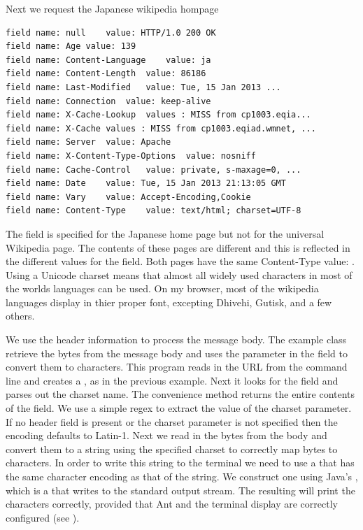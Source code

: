 Next we request the Japanese wikipedia hompage
%
\begin{verbatim}
field name: null	value: HTTP/1.0 200 OK 
field name: Age	value: 139
field name: Content-Language	value: ja
field name: Content-Length	value: 86186
field name: Last-Modified	value: Tue, 15 Jan 2013 ...
field name: Connection	value: keep-alive
field name: X-Cache-Lookup	values : MISS from cp1003.eqia...
field name: X-Cache	values : MISS from cp1003.eqiad.wmnet, ...
field name: Server	value: Apache
field name: X-Content-Type-Options	value: nosniff
field name: Cache-Control	value: private, s-maxage=0, ...
field name: Date	value: Tue, 15 Jan 2013 21:13:05 GMT
field name: Vary	value: Accept-Encoding,Cookie
field name: Content-Type	value: text/html; charset=UTF-8
\end{verbatim}
%
The field  is specified for the Japanese home page
but not for the universal Wikipedia page.  The contents of these pages are different
and this is reflected in the different values for the  field.
Both pages have the same Content-Type value: .
Using a Unicode charset means that almost all widely used characters in most of the
worlds languages can be used.
On my browser, most of the wikipedia languages display in thier proper font, excepting
Dhivehi, Gutisk, and a few others.

We use the header information to process the message body.
The example class  retrieve the bytes from the message body and
uses the  parameter in the  field to convert them
to characters.  
%
%
This program reads in the URL from the command line and creates a ,
as in the previous example.  Next it looks for the  field and
parses out the charset name.
%
%
The convenience method  returns the entire contents
of the  field.
We use a simple regex to extract the value of the charset parameter.
If no header field is present or the charset parameter is not specified
then the encoding defaults to Latin-1.
%
%
Next we read in the bytes from the body and convert them to a string
using the specified charset to correctly map bytes to characters.
%
%
In order to write this string to the terminal we need to use a 
that has the same character encoding as that of the string.
We construct one using Java's , which is a 
that writes to the standard output stream.
The resulting  will print the characters correctly,
provided that Ant and the terminal display are correctly configured (see ).

